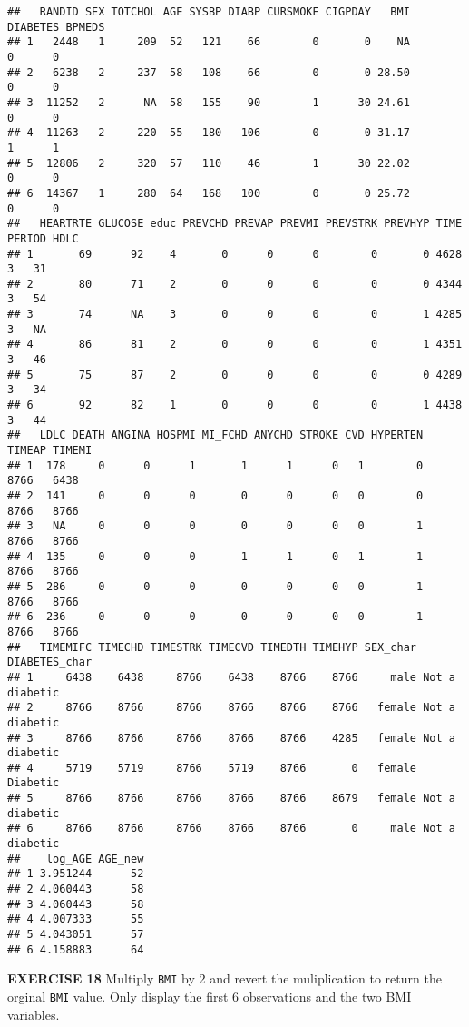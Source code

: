 \documentclass[
]{article}
\begin{document}
\begin{verbatim}
##   RANDID SEX TOTCHOL AGE SYSBP DIABP CURSMOKE CIGPDAY   BMI DIABETES BPMEDS
## 1   2448   1     209  52   121    66        0       0    NA        0      0
## 2   6238   2     237  58   108    66        0       0 28.50        0      0
## 3  11252   2      NA  58   155    90        1      30 24.61        0      0
## 4  11263   2     220  55   180   106        0       0 31.17        1      1
## 5  12806   2     320  57   110    46        1      30 22.02        0      0
## 6  14367   1     280  64   168   100        0       0 25.72        0      0
##   HEARTRTE GLUCOSE educ PREVCHD PREVAP PREVMI PREVSTRK PREVHYP TIME PERIOD HDLC
## 1       69      92    4       0      0      0        0       0 4628      3   31
## 2       80      71    2       0      0      0        0       0 4344      3   54
## 3       74      NA    3       0      0      0        0       1 4285      3   NA
## 4       86      81    2       0      0      0        0       1 4351      3   46
## 5       75      87    2       0      0      0        0       0 4289      3   34
## 6       92      82    1       0      0      0        0       1 4438      3   44
##   LDLC DEATH ANGINA HOSPMI MI_FCHD ANYCHD STROKE CVD HYPERTEN TIMEAP TIMEMI
## 1  178     0      0      1       1      1      0   1        0   8766   6438
## 2  141     0      0      0       0      0      0   0        0   8766   8766
## 3   NA     0      0      0       0      0      0   0        1   8766   8766
## 4  135     0      0      0       1      1      0   1        1   8766   8766
## 5  286     0      0      0       0      0      0   0        1   8766   8766
## 6  236     0      0      0       0      0      0   0        1   8766   8766
##   TIMEMIFC TIMECHD TIMESTRK TIMECVD TIMEDTH TIMEHYP SEX_char  DIABETES_char
## 1     6438    6438     8766    6438    8766    8766     male Not a diabetic
## 2     8766    8766     8766    8766    8766    8766   female Not a diabetic
## 3     8766    8766     8766    8766    8766    4285   female Not a diabetic
## 4     5719    5719     8766    5719    8766       0   female       Diabetic
## 5     8766    8766     8766    8766    8766    8679   female Not a diabetic
## 6     8766    8766     8766    8766    8766       0     male Not a diabetic
##    log_AGE AGE_new
## 1 3.951244      52
## 2 4.060443      58
## 3 4.060443      58
## 4 4.007333      55
## 5 4.043051      57
## 6 4.158883      64
\end{verbatim}

\textbf{EXERCISE 18} Multiply \texttt{BMI} by 2 and revert the
muliplication to return the orginal \texttt{BMI} value. Only display the
first 6 observations and the two BMI variables.
\end{document}

